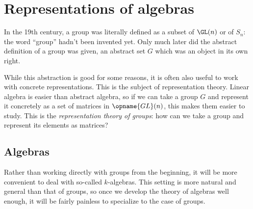 \chapter{Representations of algebras}
In the 19th century, a group was literally defined
as a subset of $\GL(n)$ or of $S_n$: the word ``group'' hadn't been invented yet.
Only much later did the abstract definition of a group was given,
an abstract set $G$ which was an object in its own right.

While this abstraction is good for some reasons,
it is often also useful to work with concrete representations.
This is the subject of representation theory.
Linear algebra is easier than abstract algebra,
so if we can take a group $G$ and represent it concretely
as a set of matrices in $\opname{GL}(n)$,
this makes them easier to study.
This is the \emph{representation theory of groups}:
how can we take a group and represent its elements as matrices?

\section{Algebras}
Rather than working directly with groups from the beginning,
it will be more convenient to deal with so-called $k$-algebras.
This setting is more natural and general than that of groups,
so once we develop the theory of algebras well enough,
it will be fairly painless to specialize to the case of groups.

